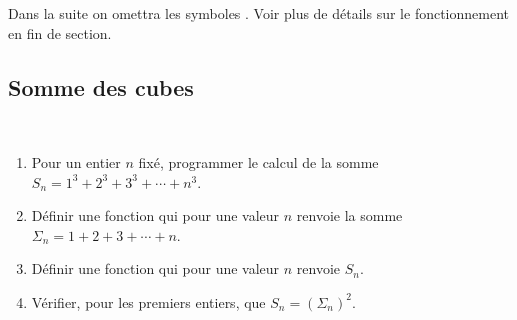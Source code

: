 \documentclass[class=report,crop=false]{standalone}
\begin{document}
Dans la suite on omettra les symboles \codeinline{>>>}. Voir plus de détails sur le fonctionnement en fin de section.

\subsection{Somme des cubes}

\begin{tp}~
\begin{enumerate}
  \item Pour un entier $n$ fixé, programmer le calcul de la somme $S_n = 1^3+2^3+3^3+ \cdots + n^3$.
  \item Définir une fonction qui pour une valeur $n$ renvoie la somme $\Sigma_n = 1+2+3+\cdots+n$.
  \item Définir une fonction qui pour une valeur $n$ renvoie $S_n$.
  \item Vérifier, pour les premiers entiers, que $S_n = (\Sigma_n)^2$.
\end{enumerate}
\end{tp}
\end{document}
